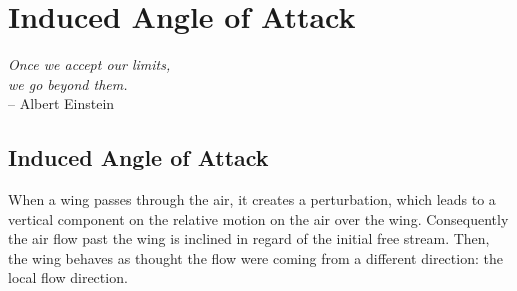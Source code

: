 \chapter{Induced Angle of Attack}
\label{ch:iaoa}
%
%
%
%
%
%
%

\begin{flushright}
	{\smaller
		\textit{Once we accept our limits,\\  we go beyond them.}\\
		-- Albert Einstein}
\end{flushright}

\section{Induced Angle of Attack}
When a wing passes through the air, it creates a perturbation, which leads to a vertical component on the relative motion on the air over the wing. Consequently the air flow past the wing is inclined in regard of the initial free stream. Then, the wing behaves as thought the flow were coming from a different direction: the local flow direction.

